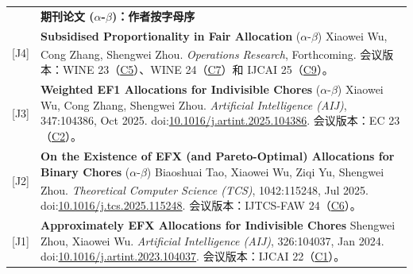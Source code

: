 \documentclass[UTF8, fontset=none, letterpaper, 11pt]{ctexart}
\newcommand{\headingfont}{\Large\bfseries\color{OliveGreen}}
\newenvironment{SectionTable}[1]{
  \renewcommand*{\arraystretch}{1.2}
  \setlength{\tabcolsep}{10pt}
  \begin{longtable}{Rp{5.2in}} & #1 \\}
{\end{longtable}\vspace{-1cm}}
\begin{document}
\begin{SectionTable}{\headingfont 期刊论文 \; \small\color{black}  ($\alpha$-$\beta$)：作者按字母序}
{[J4]} &
\textbf{Subsidised Proportionality in Fair Allocation} \newline
($\alpha$-$\beta$) Xiaowei Wu, Cong Zhang, Shengwei Zhou\textsuperscript{\Letter}.  \newline
\textit{Operations Research}, Forthcoming. \newline 会议版本：WINE 23（\hyperlink{OR-WINE23}{C5}）、WINE 24（\hyperlink{OR-WINE24}{C7}）和 IJCAI 25（\hyperlink{OR-IJCAI25}{C9}）。\\

{[J3]} &
\textbf{Weighted EF1 Allocations for Indivisible Chores} \newline
($\alpha$-$\beta$) Xiaowei Wu, Cong Zhang, Shengwei Zhou.  \newline
\textit{Artificial Intelligence (AIJ)}, 347:104386, Oct 2025. doi:\href{https://doi.org/10.1016/j.artint.2025.104386}{10.1016/j.artint.2025.104386}. \newline 会议版本：EC 23（\hyperlink{WEF1-EC23}{C2}）。\\

{[J2]} &
\textbf{On the Existence of EFX (and Pareto-Optimal) Allocations for Binary Chores} \newline
($\alpha$-$\beta$) Biaoshuai Tao, Xiaowei Wu, Ziqi Yu, Shengwei Zhou\textsuperscript{\Letter}.  \newline
\textit{Theoretical Computer Science (TCS)}, 1042:115248, Jul 2025.\newline
doi:\href{https://doi.org/10.1016/j.tcs.2025.115248}{10.1016/j.tcs.2025.115248}. 会议版本：IJTCS-FAW 24（\hyperlink{EFX-IJTCS24}{C6}）。\\

{[J1]} &
\textbf{Approximately EFX Allocations for Indivisible Chores} \newline
Shengwei Zhou, Xiaowei Wu.  \newline
\textit{Artificial Intelligence (AIJ)}, 326:104037, Jan 2024. doi:\href{https://doi.org/10.1016/j.artint.2023.104037}{10.1016/j.artint.2023.104037}. \newline 会议版本：IJCAI 22（\hyperlink{EFX-IJCAI22}{C1}）。\\
\end{SectionTable}
\end{document}

